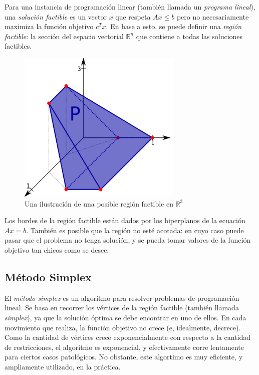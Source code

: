 \documentclass[a4paper]{report}
\newcommand{\R}{\mathbb{R}}
\begin{document}
Para una instancia de programación linear (también llamada un \textit{programa lineal}), una \textit{solución factible} es un vector $x$ que respeta $Ax \leq b$ pero no necesariamente maximiza la función objetivo $c^T x$. En base a esto, se puede definir una \textit{región factible}: la sección del espacio vectorial $\R^n$ que contiene a todas las soluciones factibles.

\begin{figure}
    \centering
    \includegraphics[width=0.7\textwidth]{region_factible_LP.png}
    \caption*{Una ilustración de una posible región factible en $\R^3$}
\end{figure}

Los bordes de la región factible están dados por los hiperplanos de la ecuación $Ax = b$. También es posible que la región no esté acotada: en cuyo caso puede pasar que el problema no tenga solución, y se pueda tomar valores de la función objetivo tan chicos como se desee.

\subsection{Método Simplex}

El \textit{método simplex} es un algoritmo para resolver problemas de programación lineal. Se basa en recorrer los vértices de la región factible (también llamada \textit{simplex}), ya que la solución óptima se debe encontrar en uno de ellos. En cada movimiento que realiza, la función objetivo no crece (e, idealmente, decrece). Como la cantidad de vértices crece exponencialmente con respecto a la cantidad de restricciones, el algoritmo es exponencial, y efectivamente corre lentamente para ciertos casos patológicos. No obstante, este algortimo es muy eficiente, y ampliamente utilizado, en la práctica.
\end{document}
